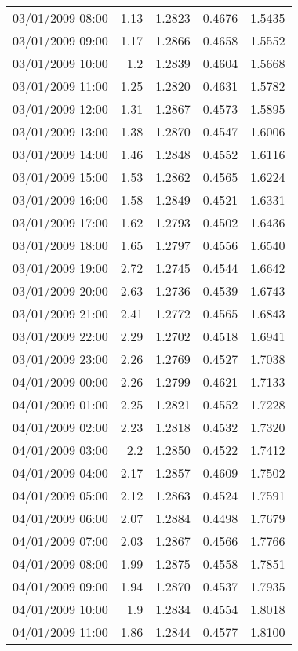 \begin{longtable}{|l|r|r|r|r|}
03/01/2009 08:00 & 1.13 & 1.2823 & 0.4676 & 1.5435 \\
03/01/2009 09:00 & 1.17 & 1.2866 & 0.4658 & 1.5552 \\
03/01/2009 10:00 & 1.2 & 1.2839 & 0.4604 & 1.5668 \\
03/01/2009 11:00 & 1.25 & 1.2820 & 0.4631 & 1.5782 \\
03/01/2009 12:00 & 1.31 & 1.2867 & 0.4573 & 1.5895 \\
03/01/2009 13:00 & 1.38 & 1.2870 & 0.4547 & 1.6006 \\
03/01/2009 14:00 & 1.46 & 1.2848 & 0.4552 & 1.6116 \\
03/01/2009 15:00 & 1.53 & 1.2862 & 0.4565 & 1.6224 \\
03/01/2009 16:00 & 1.58 & 1.2849 & 0.4521 & 1.6331 \\
03/01/2009 17:00 & 1.62 & 1.2793 & 0.4502 & 1.6436 \\
03/01/2009 18:00 & 1.65 & 1.2797 & 0.4556 & 1.6540 \\
03/01/2009 19:00 & 2.72 & 1.2745 & 0.4544 & 1.6642 \\
03/01/2009 20:00 & 2.63 & 1.2736 & 0.4539 & 1.6743 \\
03/01/2009 21:00 & 2.41 & 1.2772 & 0.4565 & 1.6843 \\
03/01/2009 22:00 & 2.29 & 1.2702 & 0.4518 & 1.6941 \\
03/01/2009 23:00 & 2.26 & 1.2769 & 0.4527 & 1.7038 \\
04/01/2009 00:00 & 2.26 & 1.2799 & 0.4621 & 1.7133 \\
04/01/2009 01:00 & 2.25 & 1.2821 & 0.4552 & 1.7228 \\
04/01/2009 02:00 & 2.23 & 1.2818 & 0.4532 & 1.7320 \\
04/01/2009 03:00 & 2.2 & 1.2850 & 0.4522 & 1.7412 \\
04/01/2009 04:00 & 2.17 & 1.2857 & 0.4609 & 1.7502 \\
04/01/2009 05:00 & 2.12 & 1.2863 & 0.4524 & 1.7591 \\
04/01/2009 06:00 & 2.07 & 1.2884 & 0.4498 & 1.7679 \\
04/01/2009 07:00 & 2.03 & 1.2867 & 0.4566 & 1.7766 \\
04/01/2009 08:00 & 1.99 & 1.2875 & 0.4558 & 1.7851 \\
04/01/2009 09:00 & 1.94 & 1.2870 & 0.4537 & 1.7935 \\
04/01/2009 10:00 & 1.9 & 1.2834 & 0.4554 & 1.8018 \\
04/01/2009 11:00 & 1.86 & 1.2844 & 0.4577 & 1.8100 \\

\end{longtable}

